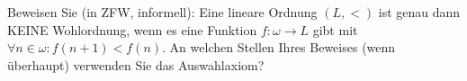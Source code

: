 
\begin{exercise}[286]

Beweisen Sie (in ZFW, informell): Eine lineare Ordnung $(L,<)$ ist genau dann
KEINE Wohlordnung, wenn es eine Funktion $f: \omega \to L$ gibt mit
$\forall n \in \omega: f(n+1) < f(n)$. An welchen Stellen Ihres Beweises
(wenn überhaupt) verwenden Sie das Auswahlaxiom?

\end{exercise}


\begin{solution}

\phantom{}

\end{solution}


